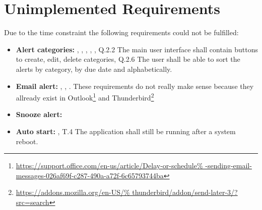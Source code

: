 \section{Unimplemented Requirements}\label{sec:unimplreq}

Due to the time constraint the following requirements could not be fulfilled:

\begin{itemize}

    \item \textbf{Alert categories:}
        ,
        ,
        ,
        ,
        , Q.2.2 The main user interface
        shall contain buttons to create, edit, delete categories, Q.2.6 The user
        shall be able to sort the alerts by category, by due date and
        alphabetically.

    \item \textbf{Email alert:}
        ,
        ,
        . These requirements do not
        really make sense because they allready exist in Outlook\footnote{\url{
                https://support.office.com/en-us/article/Delay-or-schedule%
                -sending-email-messages-026af69f-c287-490a-a72f-6c65793744ba}}
                and Thunderbird\footnote{\url{https://addons.mozilla.org/en-US/%
                thunderbird/addon/send-later-3/?src=search}}

     \item \textbf{Snooze alert:}

     \item \textbf{Auto start:}
         , T.4 The application shall still be
         running after a system reboot.


\end{itemize}
